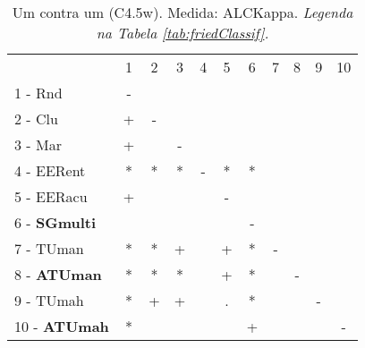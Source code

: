 \begin{table}[h]
\caption{Um contra um (C4.5w). Medida: ALCKappa. \textit{Legenda na Tabela \ref{tab:friedClassif}.}}
\begin{center}\begin{tabular}{lcc|cc|cc|cc|cc}
 			& 1 & 2 & 3 & 4 & 5 & 6 & 7 & 8 & 9 & 10\\
1 - Rnd  	& - &   &   &   &   &   &   &   &   &   \\
2 - Clu  	& + & - &   &   &   &   &   &   &   &   \\ \hline
3 - Mar  	& + &   & - &   &   &   &   &   &   &   \\
4 - EERent	& * & * & * & - & * & * &   &   &   &   \\ \hline
5 - EERacu	& + &   &   &   & - &   &   &   &   &   \\
6 - \textbf{SGmulti}	&   &   &   &   &   & - &   &   &   &   \\ \hline
7 - TUman	& * & * & + &   & + & * & - &   &   &   \\
8 - \textbf{ATUman}	& * & * & * &   & + & * &   & - &   &   \\ \hline
9 - TUmah	& * & + & + &   & . & * &   &   & - &   \\
10 - \textbf{ATUmah}	& * &   &   &   &   & + &   &   &   & - \\ \hline\end{tabular}
\label{stratsALCKappaFriedC4.5wRedux}
\end{center}
\end{table}